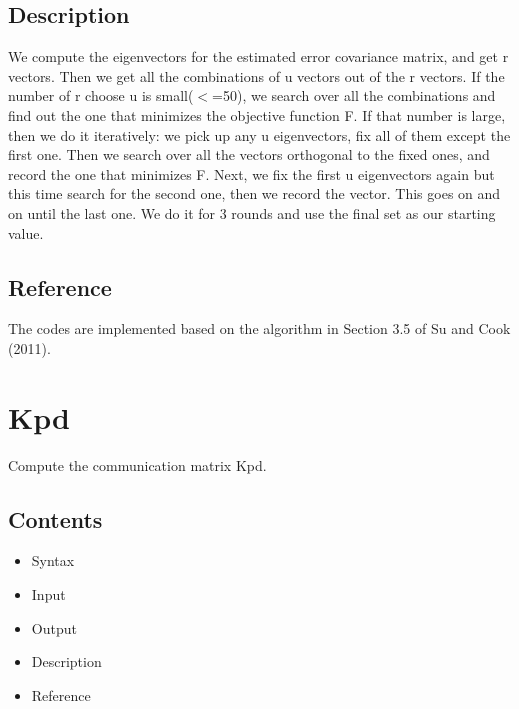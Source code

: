 \documentclass[a4paper,11pt,openany]{memoir}
\begin{document}
\subsection*{Description}

\begin{par}
We compute the eigenvectors for the estimated error covariance matrix, and get r vectors.  Then we get all the combinations of u vectors out of the r vectors. If the number of r choose u is small(\ensuremath{<}=50), we search over all the combinations and find out the one that minimizes the objective function F. If that number is large, then we do it iteratively: we pick up any u eigenvectors, fix all of them except the first one. Then we search over all the vectors orthogonal to the fixed ones, and record the one that minimizes F. Next, we fix the first u eigenvectors again but this time search for the second one, then we record the vector. This goes on and on until the last one. We do it for 3 rounds and use the final set as our starting value.
\end{par} \vspace{1em}


\subsection*{Reference}

\begin{par}
The codes are implemented based on the algorithm in Section 3.5 of Su and Cook (2011).
\end{par} \vspace{1em}


\newpage

\rmfamily
\color{black}\section{Kpd}

\begin{par}
Compute the communication matrix Kpd.
\end{par} \vspace{1em}

\subsection*{Contents}

\begin{itemize}
\setlength{\itemsep}{-1ex}
   \item Syntax
   \item Input
   \item Output
   \item Description
   \item Reference
\end{itemize}
\end{document}

